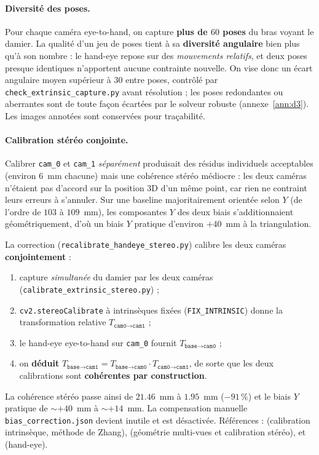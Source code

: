 \paragraph{Diversité des poses.}
Pour chaque caméra eye-to-hand, on capture \textbf{plus de $60$ poses} du bras
voyant le damier. La qualité d'un jeu de poses tient à sa
\textbf{diversité angulaire} bien plus qu'à son nombre : le hand-eye repose sur
des \emph{mouvements relatifs}, et deux poses presque identiques n'apportent
aucune contrainte nouvelle. On vise donc un écart angulaire moyen supérieur à
$30$\textdegree{} entre poses, contrôlé par \texttt{check\_extrinsic\_capture.py}
avant résolution ; les poses redondantes ou aberrantes sont de toute façon
écartées par le solveur robuste (annexe~\ref{ann:d3}). Les images annotées sont
conservées pour traçabilité.

\paragraph{Calibration stéréo conjointe.}
Calibrer \texttt{cam\_0} et \texttt{cam\_1} \emph{séparément} produisait des
résidus individuels acceptables (environ $6$~mm chacune) mais une cohérence
stéréo médiocre : les deux caméras n'étaient pas d'accord sur la position 3D
d'un même point, car rien ne contraint leurs erreurs à s'annuler. Sur une
baseline majoritairement orientée selon $Y$ (de l'ordre de $103$ à $109$~mm),
les composantes $Y$ des deux biais s'additionnaient géométriquement, d'où un
biais $Y$ pratique d'environ $+40$~mm à la triangulation.

La correction (\texttt{recalibrate\_handeye\_stereo.py}) calibre les deux
caméras \textbf{conjointement} :
\begin{enumerate}
  \item capture \emph{simultanée} du damier par les deux caméras
        (\texttt{calibrate\_extrinsic\_stereo.py}) ;
  \item \texttt{cv2.stereoCalibrate} à intrinsèques fixées
        (\texttt{FIX\_INTRINSIC}) donne la transformation relative
        $T_{\texttt{cam0}\rightarrow\texttt{cam1}}$ ;
  \item le hand-eye eye-to-hand sur \texttt{cam\_0} fournit
        $T_{\texttt{base}\rightarrow\texttt{cam0}}$ ;
  \item on \textbf{déduit}
        $T_{\texttt{base}\rightarrow\texttt{cam1}} =
        T_{\texttt{base}\rightarrow\texttt{cam0}} \cdot
        T_{\texttt{cam0}\rightarrow\texttt{cam1}}$, de sorte que les deux
        calibrations sont \textbf{cohérentes par construction}.
\end{enumerate}
La cohérence stéréo passe ainsi de $21.46$~mm à $1.95$~mm ($-91\,\%$) et le
biais $Y$ pratique de $\sim +40$~mm à $\sim +14$~mm. La compensation manuelle
\texttt{bias\_correction.json} devient inutile et est désactivée. Références :
\cite{zhang_flexible_2000} (calibration intrinsèque, méthode de Zhang),
\cite{hartley_multiple_2018} (géométrie multi-vues et calibration stéréo),
\cite{tsai_new_1989} et \cite{horaud_hand-eye_1995} (hand-eye).
